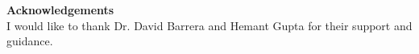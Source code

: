 \thispagestyle{plain}
\vspace{0.9cm}
\textbf{Acknowledgements}\\
I would like to thank Dr. David Barrera and Hemant Gupta for their support and guidance.